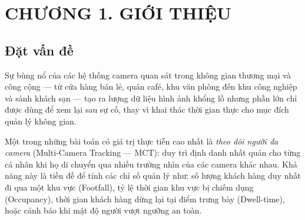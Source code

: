 \documentclass{article} %
\begin{document}
\graphicspath{{Images/}}



\tableofcontents
\thispagestyle{empty}
\clearpage


{\let\oldnumberline\numberline
\renewcommand{\numberline}{Hình~\oldnumberline}
\listoffigures}
\newpage

{\let\oldnumberline\numberline
\renewcommand{\numberline}{Bảng~\oldnumberline}
\listoftables}
\newpage



\section*{CHƯƠNG 1.  GIỚI THIỆU}
\setcounter{section}{1}
\setcounter{subsection}{0}
\setcounter{figure}{0}
\setcounter{table}{0}

\subsection{Đặt vấn đề}

Sự bùng nổ của các hệ thống camera quan sát trong không gian thương mại và công cộng --- từ cửa hàng bán lẻ, quán café, khu văn phòng đến khu công nghiệp và sảnh khách sạn --- tạo ra lượng dữ liệu hình ảnh khổng lồ nhưng phần lớn chỉ được dùng để xem lại sau sự cố, thay vì khai thác thời gian thực cho mục đích quản lý không gian.

Một trong những bài toán có giá trị thực tiễn cao nhất là \textit{theo dõi người đa camera} (Multi-Camera Tracking --- MCT): duy trì định danh nhất quán cho từng cá nhân khi họ di chuyển qua nhiều trường nhìn của các camera khác nhau. Khả năng này là tiền đề để tính các chỉ số quản lý như: số lượng khách hàng duy nhất đi qua một khu vực (Footfall), tỷ lệ thời gian khu vực bị chiếm dụng (Occupancy), thời gian khách hàng dừng lại tại điểm trưng bày (Dwell-time), hoặc cảnh báo khi mật độ người vượt ngưỡng an toàn.
\end{document}
